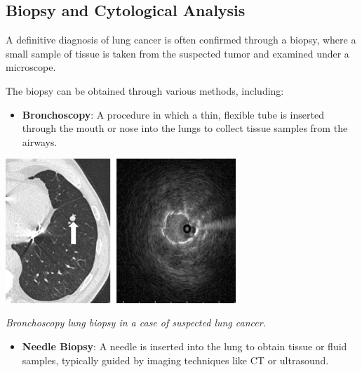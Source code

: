 \subsection{Biopsy and Cytological Analysis}
A definitive diagnosis of lung cancer is often confirmed through a biopsy, where a small sample of 
tissue is taken from the suspected tumor and examined under a microscope. 

The biopsy can be obtained through various methods, including:

\begin{itemize}
    \item \textbf{Bronchoscopy}: A procedure in which a thin, flexible tube is inserted through the 
    mouth or nose into the lungs to collect tissue samples from the airways.
\end{itemize}

\vspace{1em}
\begin{center}
    \includegraphics[width=0.65\textwidth]{../assets/04-diagnosis/lc-bronchoscopy.jpg}

    \small\textit{Bronchoscopy lung biopsy in a case of suspected lung cancer. 
    \cite{haas2018bronchoscopic}}
\end{center}
\vspace{1em}

\begin{itemize}
    \item \textbf{Needle Biopsy}: A needle is inserted into the lung to obtain tissue or fluid 
    samples, typically guided by imaging techniques like CT or ultrasound.
\end{itemize}


